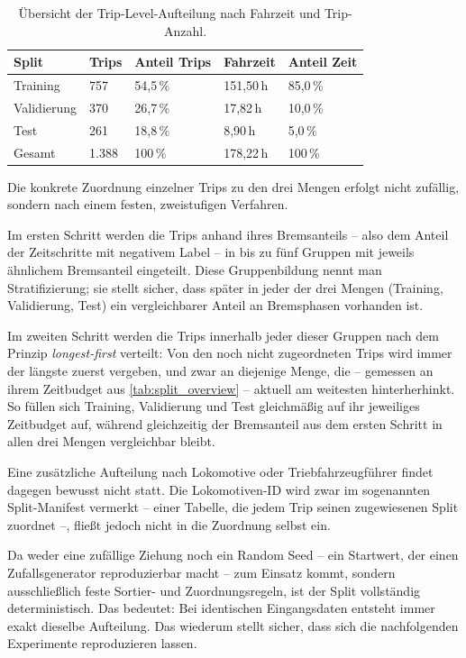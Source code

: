 \begin{table}[h]
    \centering
    \small
    \caption[Trip-Level-Aufteilung]{Übersicht der Trip-Level-Aufteilung nach Fahrzeit und Trip-Anzahl.}
    \label{tab:split_overview}
    \begin{tabularx}{\textwidth}{@{} l X X X X @{}}
        \toprule
        \textbf{Split} & \textbf{Trips} & \textbf{Anteil Trips} & \textbf{Fahrzeit} & \textbf{Anteil Zeit} \\
        \midrule
        Training    & 757   & 54,5\,\% & 151,50\,h & 85,0\,\% \\
        Validierung & 370   & 26,7\,\% & 17,82\,h  & 10,0\,\% \\
        Test        & 261   & 18,8\,\% & 8,90\,h   & 5,0\,\% \\
        \midrule
        Gesamt      & 1{.}388 & 100\,\%  & 178,22\,h & 100\,\% \\
        \bottomrule
    \end{tabularx}
\end{table}

Die konkrete Zuordnung einzelner Trips zu den drei Mengen erfolgt nicht zufällig, sondern nach einem festen, zweistufigen Verfahren.

Im ersten Schritt werden die Trips anhand ihres Bremsanteils -- also dem Anteil der Zeitschritte mit negativem Label -- in bis zu fünf Gruppen mit jeweils ähnlichem Bremsanteil eingeteilt. Diese Gruppenbildung nennt man Stratifizierung; sie stellt sicher, dass später in jeder der drei Mengen (Training, Validierung, Test) ein vergleichbarer Anteil an Bremsphasen vorhanden ist.

Im zweiten Schritt werden die Trips innerhalb jeder dieser Gruppen nach dem Prinzip \emph{longest-first} verteilt: Von den noch nicht zugeordneten Trips wird immer der längste zuerst vergeben, und zwar an diejenige Menge, die -- gemessen an ihrem Zeitbudget aus \autoref{tab:split_overview} -- aktuell am weitesten hinterherhinkt. So füllen sich Training, Validierung und Test gleichmäßig auf ihr jeweiliges Zeitbudget auf, während gleichzeitig der Bremsanteil aus dem ersten Schritt in allen drei Mengen vergleichbar bleibt.

Eine zusätzliche Aufteilung nach Lokomotive oder Triebfahrzeugführer findet dagegen bewusst nicht statt. Die Lokomotiven-ID wird zwar im sogenannten Split-Manifest vermerkt -- einer Tabelle, die jedem Trip seinen zugewiesenen Split zuordnet --, fließt jedoch nicht in die Zuordnung selbst ein.

Da weder eine zufällige Ziehung noch ein Random Seed -- ein Startwert, der einen Zufallsgenerator reproduzierbar macht -- zum Einsatz kommt, sondern ausschließlich feste Sortier- und Zuordnungsregeln, ist der Split vollständig deterministisch. Das bedeutet: Bei identischen Eingangsdaten entsteht immer exakt dieselbe Aufteilung. Das wiederum stellt sicher, dass sich die nachfolgenden Experimente reproduzieren lassen.

